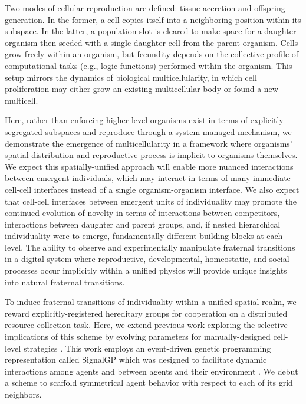 Two modes of cellular reproduction are defined: tissue accretion and offspring generation.
In the former, a cell copies itself into a neighboring position within its subspace.
In the latter, a population slot is cleared to make space for a daughter organism then seeded with a single daughter cell from the parent organism.
Cells grow freely within an organism, but fecundity depends on the collective profile of computational tasks (e.g., logic functions) performed within the organism.
This setup mirrors the dynamics of biological multicellularity, in which cell proliferation may either grow an existing multicellular body or found a new multicell.

Here, rather than enforcing higher-level organisms exist in terms of explicitly segregated subspaces and reproduce through a system-managed mechanism, we demonstrate the emergence of multicellularity in a framework where organisms' spatial distribution and reproductive process is implicit to organisms themselves.
We expect this spatially-unified approach will enable more nuanced interactions between emergent individuals, which may interact in terms of many immediate cell-cell interfaces instead of a single organism-organism interface.
We also expect that cell-cell interfaces between emergent units of individuality may promote the continued evolution of novelty in terms of interactions between competitors, interactions between daughter and parent groups, and, if nested hierarchical individuality were to emerge, fundamentally different building blocks at each level.
The ability to observe and experimentally manipulate fraternal transitions in a digital system where reproductive, developmental, homeostatic, and social  processes occur implicitly within a unified physics will provide unique insights into natural fraternal transitions.

To induce fraternal transitions of individuality within a unified spatial realm, we reward explicitly-registered hereditary groups for cooperation on a distributed resource-collection task.
Here, we extend previous work exploring the selective implications of this scheme by evolving parameters for manually-designed cell-level strategies \citep{moreno2019toward}.
This work employs an event-driven genetic programming representation called  SignalGP which was designed to facilitate dynamic interactions among agents and between agents and their environment \citep{lalejini2018evolving}.
We debut a scheme to scaffold symmetrical agent behavior with respect to each of its grid neighbors.
